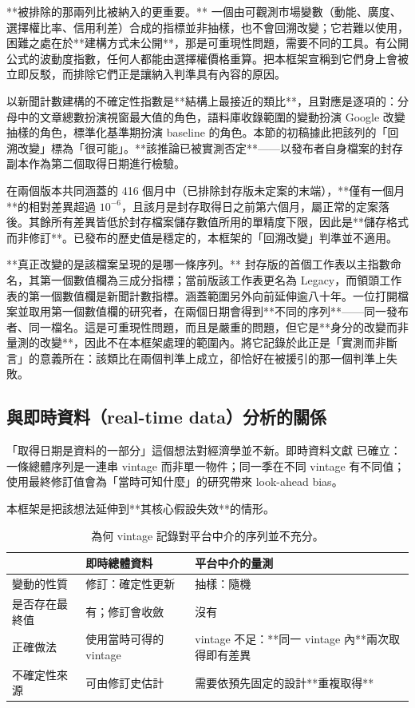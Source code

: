 \documentclass[12pt,a4paper,oneside]{article}
\begin{document}
**被排除的那兩列比被納入的更重要。** 一個由可觀測市場變數（動能、廣度、選擇權比率、信用利差）合成的指標並非抽樣，也不會回溯改變；它若難以使用，困難之處在於**建構方式未公開**，那是可重現性問題，需要不同的工具。有公開公式的波動度指數，任何人都能由選擇權價格重算。把本框架宣稱到它們身上會被立即反駁，而排除它們正是讓納入判準具有內容的原因。

以新聞計數建構的不確定性指數是**結構上最接近的類比**，且對應是逐項的：分母中的文章總數扮演視窗最大值的角色，語料庫收錄範圍的變動扮演 Google 改變抽樣的角色，標準化基準期扮演 baseline 的角色。本節的初稿據此把該列的「回溯改變」標為「很可能」。**該推論已被實測否定**——以發布者自身檔案的封存副本作為第二個取得日期進行檢驗。

在兩個版本共同涵蓋的 416 個月中（已排除封存版未定案的末端），**僅有一個月**的相對差異超過 $10^{-6}$，且該月是封存取得日之前第六個月，屬正常的定案落後。其餘所有差異皆低於封存檔案儲存數值所用的單精度下限，因此是**儲存格式而非修訂**。已發布的歷史值是穩定的，本框架的「回溯改變」判準並不適用。

**真正改變的是該檔案呈現的是哪一條序列。** 封存版的首個工作表以主指數命名，其第一個數值欄為三成分指標；當前版該工作表更名為 Legacy，而領頭工作表的第一個數值欄是新聞計數指標。涵蓋範圍另外向前延伸逾八十年。一位打開檔案並取用第一個數值欄的研究者，在兩個日期會得到**不同的序列**——同一發布者、同一檔名。這是可重現性問題，而且是嚴重的問題，但它是**身分的改變而非量測的改變**，因此不在本框架處理的範圍內。將它記錄於此正是「實測而非斷言」的意義所在：該類比在兩個判準上成立，卻恰好在被援引的那一個判準上失敗。

\subsection{與即時資料（real-time data）分析的關係}\label{sec:realtimedata-zh}

「取得日期是資料的一部分」這個想法對經濟學並不新。即時資料文獻 \cite{croushore2001} 已確立：一條總體序列是一連串 vintage 而非單一物件；同一季在不同 vintage 有不同值；使用最終修訂值會為「當時可知什麼」的研究帶來 look-ahead bias。

本框架是把該想法延伸到**其核心假設失效**的情形。

\begin{table}[H]
\centering
\small
\caption{為何 vintage 記錄對平台中介的序列並不充分。}
\label{tab:vintage-zh}
\begin{tabularx}{\textwidth}{lXX}
\toprule
 & 即時總體資料 & 平台中介的量測\\
\midrule
變動的性質 & 修訂：確定性更新 & 抽樣：隨機\\
是否存在最終值 & 有；修訂會收斂 & 沒有\\
正確做法 & 使用當時可得的 vintage & vintage 不足：**同一 vintage 內**兩次取得即有差異\\
不確定性來源 & 可由修訂史估計 & 需要依預先固定的設計**重複取得**\\
\bottomrule
\end{tabularx}
\end{table}
\end{document}

